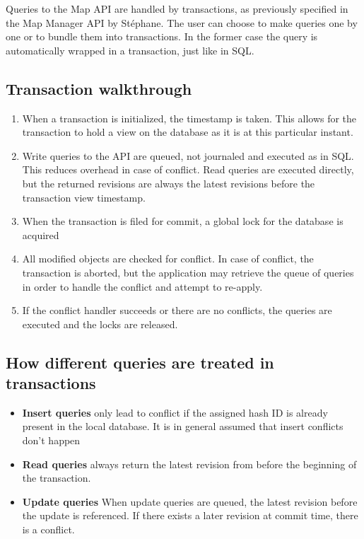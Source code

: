 \documentclass{article}
\begin{document}
Queries to the Map API are handled by transactions, as previously specified in
the Map Manager API by Stéphane. The user can choose to make queries one by one
or to bundle them into transactions. In the former case the query is
automatically wrapped in a transaction, just like in SQL. 

\subsection{Transaction walkthrough}

\begin{enumerate} \itemsep0em
  \item When a transaction is initialized, the timestamp is taken. This allows
    for the transaction to hold a view on the database as it is at this
    particular instant.
  \item Write queries to the API are queued, not journaled and executed as in 
    SQL. This reduces overhead in case of conflict. Read queries are executed
    directly, but the returned revisions are always the latest revisions before
    the transaction view timestamp.
  \item When the transaction is filed for commit, a global lock for the
    database is acquired 
  \item All modified objects are checked for conflict. In case of conflict,
    the transaction is aborted, but the application may retrieve the queue of
    queries in order to handle the conflict and attempt to re-apply.
  \item If the conflict handler succeeds or there are no conflicts, the 
    queries are executed and the locks are released.
\end{enumerate}

\subsection{How different queries are treated in transactions}

\begin{itemize} \itemsep0em
  \item {\bf Insert queries} only lead to conflict if the assigned hash ID is
    already present in the local database. It is in general assumed that insert
    conflicts don't happen 
  \item {\bf Read queries} always return the latest revision from before the
    beginning of the transaction. 
  \item {\bf Update queries} When update queries are queued, the latest
    revision before the update is referenced. If there exists a later revision 
    at commit time, there is a conflict.
\end{itemize}
\end{document}
